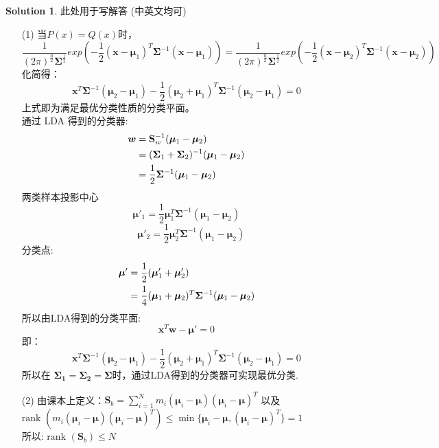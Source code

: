 \documentclass[a4paper,UTF8]{article}
\numberwithin{equation}{section}
\theoremstyle{definition}
\newtheorem*{solution}{Solution}
\newcommand{\bds}{\boldsymbol}
\begin{document}
\begin{solution}
	此处用于写解答 (中英文均可)
	\begin{enumerate}
		\item[(1)]
		当$P(x) = Q(x)$时，
		$$\frac{1}{(2\pi)^{\frac{n}{2}}\bds{\Sigma}^{\frac{1}{2}}} exp\left({-\frac{1}{2}(\bds{x} - \bds{\mu}_1)^T\bds{\Sigma}^{-1}(\bds{x}-\bds{\mu}_1)} \right)= \frac{1}{(2\pi)^{\frac{n}{2}}\bds{\Sigma}^{\frac{1}{2}}} exp\left({-\frac{1}{2}(\bds{x} - \bds{\mu}_2)^T\bds{\Sigma}^{-1}(\bds{x}-\bds{\mu}_2)} \right)$$
		化简得：
		$$\bds{x}^T\bds{\Sigma}^{-1}(\bds{\mu}_2-\bds{\mu}_1) - \frac{1}{2}(\bds{\mu}_2+\bds{\mu}_1)^T\bds{\Sigma}^{-1}(\bds{\mu}_2-\bds{\mu}_1) = 0$$
		上式即为满足最优分类性质的分类平面。\\
		通过 LDA 得到的分类器:
		\begin{equation}
			\begin{split}
				\bds{w} &= \mathbf{S}_{w}^{-1}(\bds{\mu}_1-\bds{\mu}_2) \\
				&= (\bds{\Sigma}_1+\bds{\Sigma}_2)^{-1}(\bds{\mu}_1-\bds{\mu}_2) \\
				&= \frac{1}{2}\bds{\Sigma}^{-1}(\bds{\mu}_1-\bds{\mu}_2)
			\end{split}
			\notag
		\end{equation}
		两类样本投影中心 
		$$\bds{\mu}'_1 = \frac{1}{2}\bds{\mu}_1^T\bds{\Sigma}^{-1}(\bds{\mu}_1-\bds{\mu}_2)$$
		$$\quad \bds{\mu}'_2 = \frac{1}{2}\bds{\mu}_2^T\bds{\Sigma}^{-1}(\bds{\mu}_1-\bds{\mu}_2)$$
		分类点:
		\begin{equation}
			\begin{split}
				\bds{\mu}' &= \frac{1}{2}(\bds{\mu}'_1+\bds{\mu}'_2) \\
				&= \frac{1}{4}(\bds{\mu}_1+\bds{\mu}_2)^T\bds{\Sigma}^{-1}(\bds{\mu}_1-\bds{\mu}_2)
			\end{split}
			\notag
		\end{equation}
		所以由LDA得到的分类平面:
		$$\bds{x}^T\bds{w} - \bds{\mu}' = 0$$
		即：
		$$\bds{x}^T\bds{\Sigma}^{-1}(\bds{\mu}_2-\bds{\mu}_1) - \frac{1}{2}(\bds{\mu}_2+\bds{\mu}_1)^T\bds{\Sigma}^{-1}(\bds{\mu}_2-\bds{\mu}_1) = 0$$
		所以在 $\bds{\Sigma_1} = \bds{\Sigma_2} = \bds{\Sigma}$时，通过LDA得到的分类器可实现最优分类.
		\item[(2)] 
		由课本上定义：$\textbf{S}_b = \sum_{i=1}^{N}m_i(\bds{\mu}_i-\bds{\mu})(\bds{\mu}_i-\bds{\mu})^T$ 以及 $\text{rank }(m_i(\bds{\mu}_i-\bds{\mu})(\bds{\mu}_i-\bds{\mu})^T) \leq \min\{\bds{\mu}_i-\bds{\mu},(\bds{\mu}_i-\bds{\mu})^T\} = 1$ \\
		所以: $\text{rank }(\textbf{S}_b) \leq N$ \\

\end{enumerate}
\end{solution}
\end{document}
